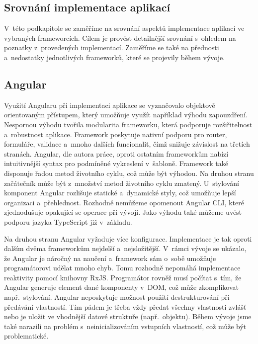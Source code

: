 \newpage




\subsection{Srovnání implementace aplikací}

V~této podkapitole se zaměříme na srovnání aspektů implementace aplikací ve vybraných frameworcích. 
Cílem je provést detailnější srovnání s~ohledem na poznatky z~provedených implementací. 
Zaměříme se také na přednosti a~nedostatky jednotlivých frameworků, které se projevily během vývoje.

\subsection*{Angular}

Využití Angularu při implementaci aplikace se vyznačovalo objektově orientovaným přístupem, který umožňuje využít například výhodu zapouzdření. 
Nespornou výhodu tvořila modularita frameworku, která podporuje rozšiřitelnost a~robustnost aplikace. 
Framework poskytuje nativní podporu pro router, formuláře, validace a~mnoho dalších funcionalit, čímž snižuje závislost na třetích stranách. 
Angular, dle autora práce, oproti ostatním frameworkům nabízí intuitivnější syntax pro podmíněné vykreslení v~šabloně. 
Framework také disponuje řadou metod životního cyklu, což může být výhodou. Na druhou stranu začátečník může být z~množství metod životního cyklu zmatený. 
U~stylování komponent Angular rozlišuje statické a~dynamické styly, což umožňuje lepší organizaci a~přehlednost. 
Rozhodně nemůžeme opomenout Angular CLI, které zjednodušuje opakující se operace při vývoji. 
Jako výhodu také můžeme uvést podporu jazyka TypeScript již v~základu. 

Na druhou stranu Angular vyžaduje více konfigurace. Implementace je tak oproti dalším dvěma frameworkům nejdelší a~nejsložitější. 
V~rámci vývoje se ukázalo, že Angular je náročný na naučení a~framework sám o~sobě umožňuje programátorovi udělat mnoho chyb. 
Tomu rozhodně nepomáhá implementace reaktivity pomocí knihovny RxJS. 
Programátor rovněž musí počítat s~tím, že Angular generuje element dané komponenty v~DOM, což může zkomplikovat např.~stylování. 
Angular neposkytuje možnost použití destrukturování při předávání vlastností. 
Tím pádem je třeba vždy předat všechny vlastnosti zvlášť nebo je uložit ve vhodnější datové struktuře (např.~objektu).
Během vývoje jsme také narazili na problém s~neinicializováním vstupních vlastností, což může být problematické. 

